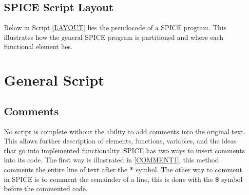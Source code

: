 \documentclass{article}
\begin{document}
\subsection{SPICE Script Layout}
Below in Script \ref{LAYOUT} lies the pseudocode of a SPICE program. This illustrates how the general SPICE program is partitioned and where each functional element lies.
\begin{center}
\end{center}
\cleardoublepage
\section{General Script}
\subsection{Comments}
No script is complete without the ability to add comments into the original text. This allows further description of elements, functions, variables, and the ideas that go into implemented functionality. SPICE has two ways to insert comments into its code. The first way is illustrated in \ref{COMMENT1}, this method comments the entire line of text after the \textbf{*} symbol. The other way to comment in SPICE is to comment the remainder of a line, this is done with the \textbf{\$} symbol before the commented code.

\begin{center}
\end{center}

\begin{center}
\end{center}
\end{document}
